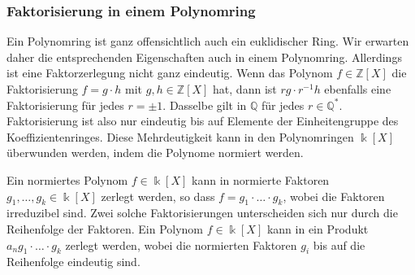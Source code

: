 \subsubsection{Faktorisierung in einem Polynomring}
Ein Polynomring ist ganz offensichtlich auch ein euklidischer Ring.
Wir erwarten daher die entsprechenden Eigenschaften auch in einem
Polynomring.
Allerdings ist eine Faktorzerlegung nicht ganz eindeutig.
Wenn das Polynom $f\in\mathbb{Z}[X]$ die Faktorisierung
$f=g\cdot h$ mit $g,h\in\mathbb{Z}[X]$ hat, dann
ist $rg\cdot r^{-1}h$ ebenfalls eine Faktorisierung für jedes $r =\pm1$.
Dasselbe gilt in $\mathbb{Q}$ für jedes $r\in \mathbb{Q}^*$.
Faktorisierung ist also nur eindeutig bis auf Elemente der
Einheitengruppe des Koeffizientenringes.
Diese Mehrdeutigkeit kann in den Polynomringen $\Bbbk[X]$ 
überwunden werden, indem die Polynome normiert werden.

\begin{satz}
Ein normiertes Polynom $f\in \Bbbk[X]$ kann in
normierte Faktoren $g_1,\dots,g_k\in\Bbbk[X]$ zerlegt werden, so dass
$f=g_1\cdot\ldots\cdot g_k$, wobei die Faktoren irreduzibel sind.
Zwei solche Faktorisierungen unterscheiden sich nur durch die Reihenfolge
der Faktoren.
Ein Polynom $f\in \Bbbk[X]$ kann in ein Produkt $a_n g_1\cdot\ldots\cdot g_k$
zerlegt werden, wobei die normierten Faktoren $g_i$ bis auf die Reihenfolge
eindeutig sind.
\end{satz}


